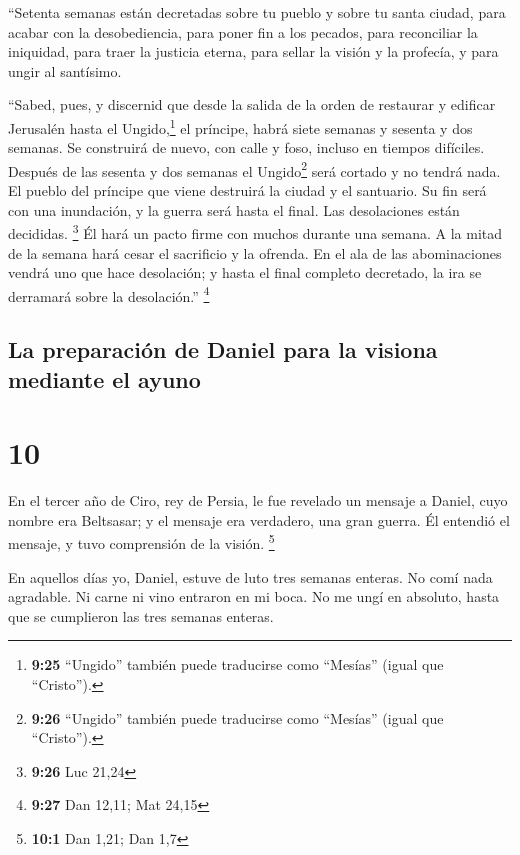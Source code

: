  ``Setenta semanas están decretadas sobre tu pueblo y
sobre tu santa ciudad, para acabar con la desobediencia, para poner fin
a los pecados, para reconciliar la iniquidad, para traer la justicia
eterna, para sellar la visión y la profecía, y para ungir al santísimo.

 ``Sabed, pues, y discernid que desde la salida de la
orden de restaurar y edificar Jerusalén hasta el Ungido,\footnote{\textbf{9:25}
  ``Ungido'' también puede traducirse como ``Mesías'' (igual que
  ``Cristo'').} el príncipe, habrá siete semanas y sesenta y dos
semanas. Se construirá de nuevo, con calle y foso, incluso en tiempos
difíciles.  Después de las sesenta y dos semanas el
Ungido\footnote{\textbf{9:26} ``Ungido'' también puede traducirse como
  ``Mesías'' (igual que ``Cristo'').} será cortado y no tendrá nada. El
pueblo del príncipe que viene destruirá la ciudad y el santuario. Su fin
será con una inundación, y la guerra será hasta el final. Las
desolaciones están decididas. \footnote{\textbf{9:26} Luc 21,24}
 Él hará un pacto firme con muchos durante una semana. A
la mitad de la semana hará cesar el sacrificio y la ofrenda. En el ala
de las abominaciones vendrá uno que hace desolación; y hasta el final
completo decretado, la ira se derramará sobre la desolación.''
\footnote{\textbf{9:27} Dan 12,11; Mat 24,15}

\hypertarget{la-preparaciuxf3n-de-daniel-para-la-visiona-mediante-el-ayuno}{%
\subsection{La preparación de Daniel para la visiona mediante el
ayuno}\label{la-preparaciuxf3n-de-daniel-para-la-visiona-mediante-el-ayuno}}

\hypertarget{section-9}{%
\section{10}\label{section-9}}

 En el tercer año de Ciro, rey de Persia, le fue revelado
un mensaje a Daniel, cuyo nombre era Beltsasar; y el mensaje era
verdadero, una gran guerra. Él entendió el mensaje, y tuvo comprensión
de la visión. \footnote{\textbf{10:1} Dan 1,21; Dan 1,7}

 En aquellos días yo, Daniel, estuve de luto tres semanas
enteras.  No comí nada agradable. Ni carne ni vino
entraron en mi boca. No me ungí en absoluto, hasta que se cumplieron las
tres semanas enteras.

